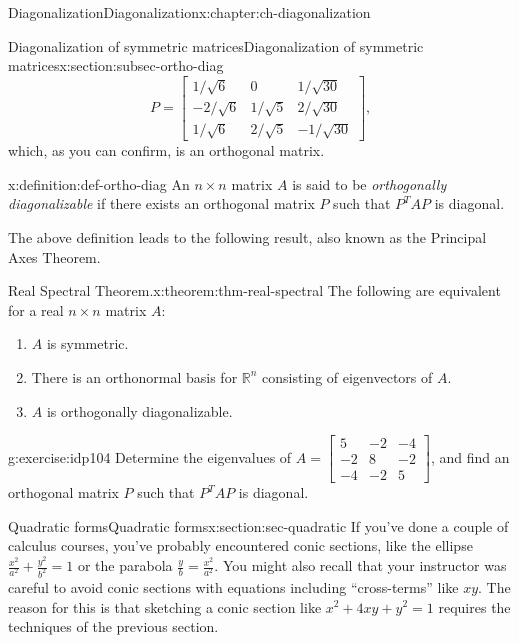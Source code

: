 \documentclass[oneside,10pt,]{book}
\numberwithin{equation}{section}
\newcommand{\bbm}{\begin{bmatrix}}
\newcommand{\ebm}{\end{bmatrix}}
\newcommand{\R}{\mathbb{R}}
\newcommand{\amp}{&}
\begin{document}
\begin{chapterptx}{Diagonalization}{}{Diagonalization}{}{}{x:chapter:ch-diagonalization}
\begin{sectionptx}{Diagonalization of symmetric matrices}{}{Diagonalization of symmetric matrices}{}{}{x:section:subsec-ortho-diag}
\begin{equation*}
P = \bbm 1/\sqrt{6}\amp 0 \amp 1/\sqrt{30}\\-2/\sqrt{6}\amp 1/\sqrt{5}\amp 2/\sqrt{30}\\1/\sqrt{6}\amp 2/\sqrt{5}\amp -1/\sqrt{30}\ebm\text{,}
\end{equation*}
which, as you can confirm, is an orthogonal matrix.%
\begin{definition}{}{x:definition:def-ortho-diag}%
An \(n\times n\) matrix \(A\) is said to be \emph{orthogonally diagonalizable} if there exists an orthogonal matrix \(P\) such that \(P^TAP\) is diagonal.%
\end{definition}
The above definition leads to the following result, also known as the Principal Axes Theorem.%
\begin{theorem}{Real Spectral Theorem.}{}{x:theorem:thm-real-spectral}%
The following are equivalent for a real \(n\times n\) matrix \(A\):%
\begin{enumerate}
\item{}\(A\) is symmetric.%
\item{}There is an orthonormal basis for \(\R^n\) consisting of eigenvectors of \(A\).%
\item{}\(A\) is orthogonally diagonalizable.%
\end{enumerate}
%
\end{theorem}
\begin{inlineexercise}{}{g:exercise:idp104}%
Determine the eigenvalues of \(A=\bbm 5\amp -2\amp -4\\-2\amp 8\amp -2\\-4\amp -2\amp 5\ebm\), and find an orthogonal matrix \(P\) such that \(P^TAP\) is diagonal.%
\end{inlineexercise}%
\end{sectionptx}
%
%
\typeout{************************************************}
\typeout{************************************************}
%
\begin{sectionptx}{Quadratic forms}{}{Quadratic forms}{}{}{x:section:sec-quadratic}
If you've done a couple of calculus courses, you've probably encountered conic sections, like the ellipse \(\frac{x^2}{a^2}+\frac{y^2}{b^2}=1\) or the parabola \(\frac{y}{b}=\frac{x^2}{a^2}\). You might also recall that your instructor was careful to avoid conic sections with equations including ``cross-terms'' like \(xy\). The reason for this is that sketching a conic section like \(x^2+4xy+y^2=1\) requires the techniques of the previous section.%

\end{sectionptx}
\end{chapterptx}
\end{document}
